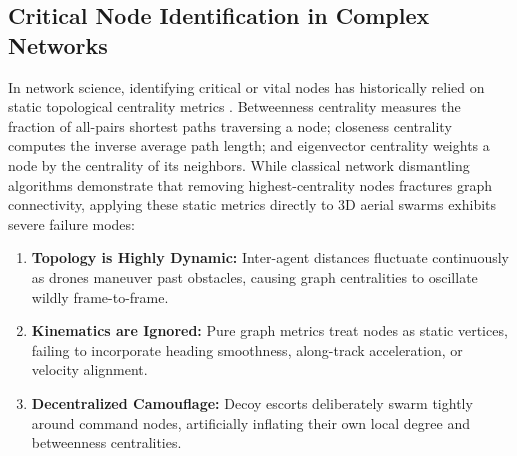 \documentclass[9pt]{ieeeconf}
\begin{document}
\subsection{Critical Node Identification in Complex Networks}
In network science, identifying critical or vital nodes has historically relied on static topological centrality metrics \cite{kitsak2010identification,holme2002attack,morone2015influence}. Betweenness centrality measures the fraction of all-pairs shortest paths traversing a node; closeness centrality computes the inverse average path length; and eigenvector centrality weights a node by the centrality of its neighbors. While classical network dismantling algorithms demonstrate that removing highest-centrality nodes fractures graph connectivity, applying these static metrics directly to 3D aerial swarms exhibits severe failure modes:
\begin{enumerate}
    \item \textbf{Topology is Highly Dynamic:} Inter-agent distances fluctuate continuously as drones maneuver past obstacles, causing graph centralities to oscillate wildly frame-to-frame.
    \item \textbf{Kinematics are Ignored:} Pure graph metrics treat nodes as static vertices, failing to incorporate heading smoothness, along-track acceleration, or velocity alignment.
    \item \textbf{Decentralized Camouflage:} Decoy escorts deliberately swarm tightly around command nodes, artificially inflating their own local degree and betweenness centralities.
\end{enumerate}
\end{document}
